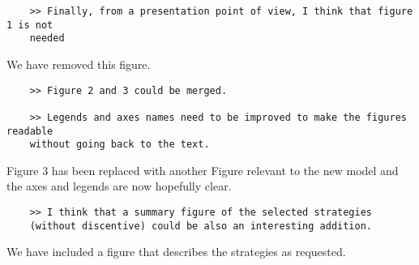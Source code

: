 \documentclass[10pt]{article}
\begin{document}
\begin{verbatim}
    >> Finally, from a presentation point of view, I think that figure 1 is not
    needed
\end{verbatim}

We have removed this figure.

\begin{verbatim}
    >> Figure 2 and 3 could be merged.

    >> Legends and axes names need to be improved to make the figures readable
    without going back to the text.
\end{verbatim}

Figure 3 has been replaced with another Figure relevant to the new model and the
axes and legends are now hopefully clear.

\begin{verbatim}
    >> I think that a summary figure of the selected strategies
    (without discentive) could be also an interesting addition.
\end{verbatim}

We have included a figure that describes the strategies as requested.
\end{document}
